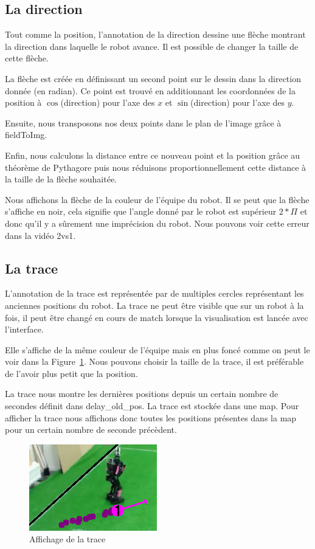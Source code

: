\subsection{La direction}

Tout comme la position, l'annotation de la direction dessine une flèche montrant la direction dans laquelle le robot avance. Il est possible de changer la taille de cette flèche.
\bigskip

La flèche est créée en définissant un second point sur le dessin dans la direction donnée (en radian). Ce point est trouvé en additionnant les coordonnées de la position à $\cos$(direction) pour l'axe des $x$ et $\sin$(direction) pour l'axe des  $y$.

Ensuite, nous transposons nos deux points dans le plan de l'image grâce à fieldToImg.

Enfin, nous calculons la distance entre ce nouveau point et la position grâce au théorème de Pythagore puis nous réduisons proportionnellement cette distance à la taille de la flèche souhaitée.
\bigskip

Nous affichons la flèche de la couleur de l'équipe du robot. Il se peut que la flèche s'affiche en noir, cela signifie que l'angle donné par le robot est supérieur $2*\Pi$ et donc qu'il y a sûrement une imprécision du robot. 
Nous pouvons voir cette erreur dans la vidéo 2vs1.


\subsection{La trace}

L'annotation de la trace est représentée par de multiples cercles représentant les anciennes positions du robot. 
La trace ne peut être visible que sur un robot à la fois, il peut être changé en cours de match lorsque la visualisation est lancée avec l'interface. 
\bigskip

Elle s'affiche de la même couleur de l'équipe mais en plus foncé comme on peut le voir dans la Figure~\ref{fig:trace}.
Nous pouvons choisir la taille de la trace, il est préférable de l'avoir plus petit que la position.


La trace nous montre les dernières positions depuis un certain nombre de secondes définit dans delay\_old\_pos. La trace est stockée dans une map.
\bigskip
Pour afficher la trace nous affichons donc toutes les positions présentes dans la map pour un certain nombre de seconde précèdent.


\begin{figure}[h] 
\centering 
\includegraphics[scale = 0.5]{images/robottrace.png}
    \caption{Affichage de la trace}
    \label{fig:trace}
\end{figure}

